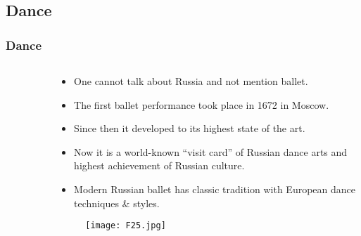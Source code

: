 \documentclass[pdflatex,compress,8pt,
	xcolor={dvipsnames,dvipsnames,svgnames,x11names,table},
	hyperref={colorlinks = true,breaklinks = true, urlcolor = NavyBlue, breaklinks = true}]{beamer}
\begin{document}
\subsection{Dance}
\begin{frame}\frametitle{Dance}
\begin{minipage}[0.4\textheight]{\textwidth}
\begin{columns}[T]
\begin{column}{0.3\textwidth}
\begin{figure}[H]
	\centering
			\vspace{3mm}
\end{figure}
\end{column}
\begin{column}{0.7\textwidth}
\vspace{1em} 
\begin{itemize}
	\item One cannot talk about Russia and not mention ballet.
	\item The first ballet performance took  place in 1672 in Moscow. 
	\item Since then it developed to its highest state of the art.
	\item Now it is a world-known “visit card” of Russian dance arts and highest achievement of Russian culture.
	\item Modern Russian ballet has classic tradition with European dance techniques \& styles.
\end{itemize}
\begin{figure}[H]
	\centering
		\texttt{[image: F25.jpg]}
\end{figure}
\end{column}
\end{columns}
\end{minipage}
\end{frame}
\end{document}

